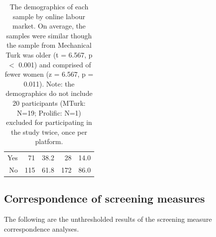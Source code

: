 \documentclass[a4paper,notitlepage,12pt]{article}
\begin{document}
\begin{refsection}[supp]
\begin{table}[!h]
\begin{tabular}{ rrrrr }
Yes            &      71 &  38.2 &       28 &  14.0 \\
No             &     115 &  61.8 &      172 &  86.0 \\
\bottomrule
\end{tabular}
\captionsetup{width=0.88\textwidth}
\caption{The demographics of each sample by online labour market. On average, the samples were similar though the sample from Mechanical Turk was older (t = 6.567, p $<$ 0.001) and comprised of fewer women (z = 6.567, p = 0.011). Note: the demographics do not include 20 participants (MTurk: N=19; Prolific: N=1) excluded for participating in the study twice, once per platform.}
\label{tab:demographics}
\end{table}

\clearpage

\subsection*{Correspondence of screening measures}

The following are the unthresholded results of the screening measure correspondence analyses.


\end{refsection}
\end{document}

